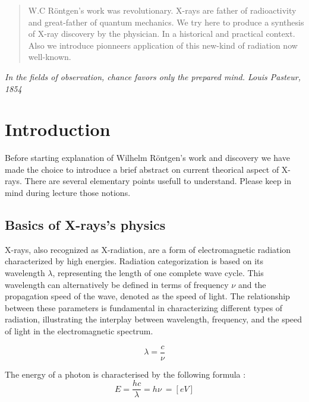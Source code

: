 \documentclass[a4paper,12pt]{report}
\begin{document}
\begin{abstract}
  W.C Röntgen's work was revolutionary. X-rays are father of radioactivity and great-father of quantum mechanics. We try here to produce a synthesis of X-ray discovery by the physician. In a historical and practical context. Also we introduce pionneers application of this new-kind of radiation now well-known.
\end{abstract}
\tableofcontents
{}


\setlength{\parskip}{10pt}


\newpage
\begin{flushright}
  \textit{In the fields of observation, chance favors only the prepared mind. Louis Pasteur, 1854}
\end{flushright}
\section*{Introduction}

Before starting explanation of Wilhelm Röntgen's work and discovery we have made the choice to introduce a brief abstract on current theorical aspect of X-rays. There are several elementary points usefull to understand. Please keep in mind during lecture those notions.


\subsection*{Basics of X-rays's physics}
X-rays, also recognized as X-radiation, are a form of electromagnetic radiation characterized by
high energies. Radiation categorization is based on its wavelength \(\lambda\), representing the length of
one complete wave cycle. This wavelength can alternatively be defined in terms of frequency \(\nu\)
and the propagation speed of the wave, denoted as the speed of light. The relationship
between these parameters is fundamental in characterizing different types of radiation, illustrating
the interplay between wavelength, frequency, and the speed of light in the electromagnetic
spectrum.

\begin{equation}
  \lambda = \frac{c}{\nu}
\end{equation}


The energy of a photon is characterised by the following formula :
\begin{equation}
E= \frac{hc}{\lambda}= h\nu\ = [eV]
\end{equation}
\end{document}
